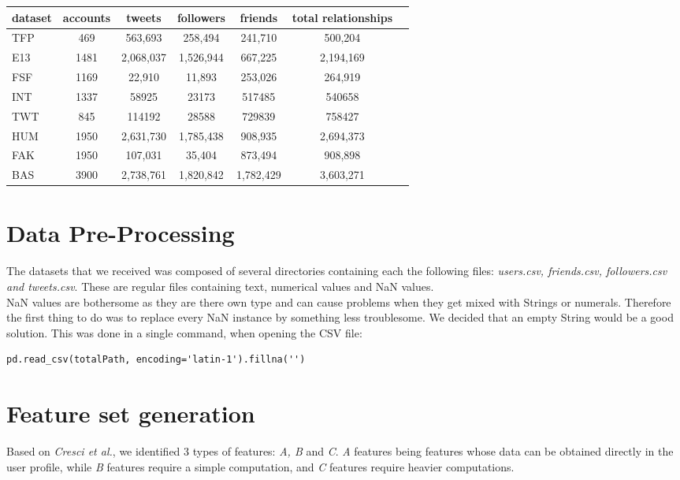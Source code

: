 \documentclass[a4paper,11pt]{article}
\begin{document}
\begin{tabular}{lcccccc}
dataset & accounts & tweets & followers & friends & total relationships \\
\hline
TFP & 469 & 563,693 & 258,494 & 241,710 & 500,204 \\
E13 & 1481 & 2,068,037 & 1,526,944 & 667,225 & 2,194,169 \\
FSF & 1169 & 22,910 & 11,893 & 253,026 & 264,919 \\
INT & 1337 & 58925 & 23173 & 517485 & 540658 \\
TWT & 845 & 114192 & 28588 & 729839 & 758427 \\
\hline
HUM & 1950 & 2,631,730 & 1,785,438 & 908,935 & 2,694,373 \\
FAK & 1950 & 107,031 & 35,404 & 873,494 & 908,898 \\
\hline
BAS & 3900 & 2,738,761 & 1,820,842 & 1,782,429 & 3,603,271 \\
\end{tabular}


\section{Data Pre-Processing}
\paragraph{}
The datasets that we received was composed of several directories containing each the following files: \textit{users.csv, friends.csv, followers.csv and tweets.csv}. These are regular files containing text, numerical values and NaN values.\\

NaN values are bothersome as they are there own type and can cause problems when they get mixed with Strings or numerals. Therefore the first thing to do was to replace every NaN instance by something less troublesome. We decided that an empty String would be a good solution. This was done in a single command, when opening the CSV file:

\begin{lstlisting}
pd.read_csv(totalPath, encoding='latin-1').fillna('')
\end{lstlisting}

\section{Feature set generation}
Based on \textit{Cresci et al.}, we identified 3 types of features: \textit{A, B} and \textit{C}. \textit{A} features being features whose data can be obtained directly in the user profile, while \textit{B} features require a simple computation, and \textit{C} features require heavier computations.\\
\end{document}
